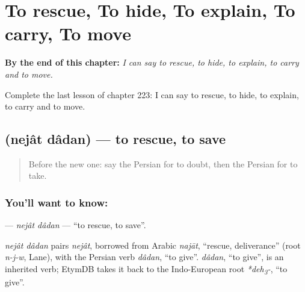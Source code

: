 
\chapter{To rescue, To hide, To explain, To carry, To move}
\label{ch:fa-to-rescue-to-hide-to-explain-to-carry-to-move}

\begin{chapteropening}
\textbf{By the end of this chapter:} \emph{I can say to rescue, to hide, to explain, to carry and to move.}

Complete the last lesson of chapter 223: I can say to rescue, to hide, to explain, to carry and to move.
\end{chapteropening}

\section[\texorpdfstring{\fa{نجات} \fa{دادن} (nejât dâdan)}{نجات دادن (nejât dâdan)}]{  (nejât dâdan) — to rescue, to save}

\label{lesson:FA-C223-nejat-dadan}



\begin{quote}
Before the new one: say the Persian for to doubt, then the Persian for to take.
\end{quote}

\subsection*{You'll want to know:  }
\textbf{ } — \emph{nejât dâdan} — \textquotedblleft{}to rescue, to save\textquotedblright{}.

\begin{cousinweb}
\emph{nejât dâdan} pairs \emph{nejât}, borrowed from Arabic \emph{najāt}, \textquotedblleft{}rescue, deliverance\textquotedblright{} (root \emph{n-j-w}, Lane), with the Persian verb \emph{dâdan}, \textquotedblleft{}to give\textquotedblright{}. \emph{dâdan}, \textquotedblleft{}to give\textquotedblright{}, is an inherited verb; EtymDB takes it back to the Indo-European root \emph{*deh\textsubscript{3}-}, \textquotedblleft{}to give\textquotedblright{}.
\end{cousinweb}

